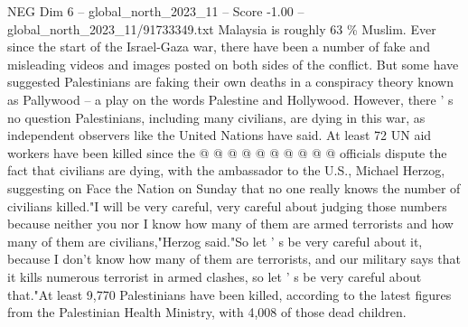 \begin{textsample}{NEG Dim 6 – global\_north\_2023\_11 – Score -1.00 – global\_north\_2023\_11/91733349.txt}
Malaysia is roughly 63 \% Muslim.
Ever since the start of the Israel-Gaza war, there have been a number of fake and misleading videos and images posted on both sides of the conflict.
But some have suggested Palestinians are faking their own deaths in a conspiracy theory known as Pallywood -- a play on the words Palestine and Hollywood.
However, there ' s no question Palestinians, including many civilians, are dying in this war, as independent observers like the United Nations have said.
At least 72 UN aid workers have been killed since the @ @ @ @ @ @ @ @ @ @ officials dispute the fact that civilians are dying, with the ambassador to the U.S., Michael Herzog, suggesting on Face the Nation on Sunday that no one really knows the number of civilians killed."I will be very careful, very careful about judging those numbers because neither you nor I know how many of them are armed terrorists and how many of them are civilians,"Herzog said."So let ' s be very careful about it, because I don't know how many of them are terrorists, and our military says that it kills numerous terrorist in armed clashes, so let ' s be very careful about that."At least 9,770 Palestinians have been killed, according to the latest figures from the Palestinian Health Ministry, with 4,008 of those dead children.

\end{textsample}
